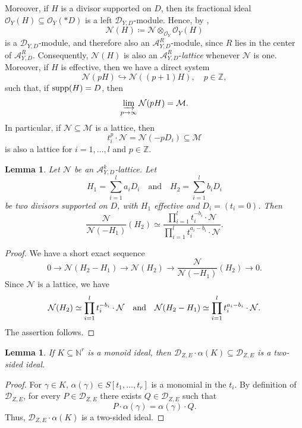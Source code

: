 \documentclass{amsart}
\theoremstyle{plain}
\numberwithin{theorem}{section}
\newtheorem{lemma}[theorem]{Lemma}
\theoremstyle{definition}
\theoremstyle{remark}
\theoremstyle{definition}
\newcommand{\C}{\mathbb{C}} %
\newcommand{\N}{\mathbb{N}}
\newcommand{\Z}{\mathbb{Z}}
\newcommand{\cM}{\mathcal{M}}
\newcommand{\cN}{\mathcal{N}}
\newcommand{\cO}{\mathscr{O}}
\newcommand{\sA}{\mathscr{A}}
\newcommand{\shD}{\mathscr{D}}
\newcommand{\supp}{\textup{supp}}
\begin{document}
Moreover, if $H$ is a divisor supported on $D$, then its fractional ideal $\cO_Y(H)\subseteq \cO_Y(*D)$ is a left $\shD_{Y,D}$-module. Hence, by \cite[Lem.2.1]{WZ},
\[
\cN(H)\coloneqq \cN\otimes_{\cO_Y}\cO_Y(H)
\]
is a $\shD_{Y,D}$-module, and therefore also an $\sA^R_{Y,D}$-module, since $R$ lies in the center of $\sA^R_{Y,D}$. Consequently, $\cN(H)$ is also an $\sA^R_{Y,D}$-\emph{lattice} whenever $\cN$ is one. Moreover, if $H$ is effective, then we have a direct system
\[
\cN(pH)\hookrightarrow \cN((p+1)H),
\quad p\in \Z,
\]
such that, if $\supp(H)=D$, then
\[
\varinjlim_{p\to\infty}\cN(pH)=\cM.
\]
In particular, if $\cN\subseteq \cM$ is a lattice, then
\[
t_i^p\cdot \cN=\cN(-pD_i)\subseteq \cM
\]
is also a lattice for $i=1,\dots,l$ and $p\in \Z$.

\begin{lemma}\label{lm:lattictwist}
Let $\cN$ be an $\sA_{Y,D}^k$-lattice. Let
\[
H_1=\sum_{i=1}^l a_iD_i
\quad \text{and} \quad
H_2=\sum_{i=1}^l b_iD_i
\]
be two divisors supported on $D$, with $H_1$ effective and $D_i=(t_i=0)$. Then
\[
\frac{\cN}{\cN(-H_1)}(H_2)
\simeq
\frac{\prod_{i=1}^l t_i^{-b_i}\cdot \cN}
{\prod_{i=1}^l t_i^{a_i-b_i}\cdot \cN}.
\]
\end{lemma}

\begin{proof}
We have a short exact sequence
\[
0
\to
\cN(H_2-H_1)
\longrightarrow
\cN(H_2)
\longrightarrow
\frac{\cN}{\cN(-H_1)}(H_2)
\to
0.
\]
Since $\cN$ is a lattice, we have
\[
\cN(H_2)
\simeq
\prod_{i=1}^l t_i^{-b_i}\cdot \cN
\quad \textup{and} \quad
\cN(H_2-H_1)
\simeq
\prod_{i=1}^l t_i^{a_i-b_i}\cdot \cN.
\]
The assertion follows.
\end{proof}

\begin{lemma}\label{lm:twosidedideal}
If $K\subseteq \N^r$ is a monoid ideal, then
$\shD_{Z,E}\cdot \alpha(K)\subseteq \shD_{Z,E}$ is a two-sided ideal.
\end{lemma}

\begin{proof}
For $\gamma\in K$, $\alpha(\gamma)\in S[t_1,\dots,t_r]$ is a monomial in the $t_i$. By definition of $\shD_{Z,E}$, for every $P\in \shD_{Z,E}$ there exists $Q\in \shD_{Z,E}$ such that
\[
P\cdot \alpha(\gamma)=\alpha(\gamma)\cdot Q.
\]
Thus, $\shD_{Z,E}\cdot \alpha(K)$ is a two-sided ideal.
\end{proof}
\end{document}
